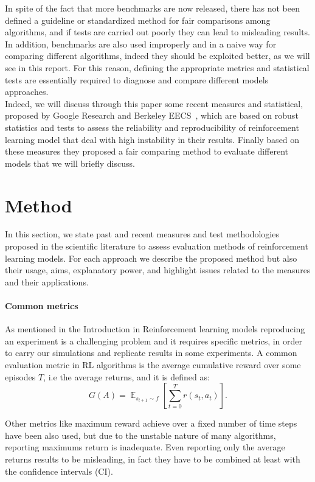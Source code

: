 \documentclass{article}
\DeclareMathOperator{\EX}{\mathbb{E}}%
\begin{document}
In spite of the fact that more benchmarks are now released, there has not been defined a guideline or standardized method for fair comparisons among algorithms, and if tests are carried out poorly they can lead to misleading results. In addition, benchmarks are also used improperly and in a naive way for comparing different algorithms, indeed they should be exploited better, as we will see in this report.
For this reason, defining the appropriate metrics and statistical tests are essentially required to diagnose and compare different models approaches.\\
Indeed, we will discuss through this paper some recent measures and statistical, proposed by Google Research and Berkeley EECS~\cite{GoogleMeasure}, which are based on robust statistics and tests to assess the reliability and reproducibility of reinforcement learning model that deal with high instability in their results. Finally based on these measures they proposed a fair comparing method to evaluate different models that we will briefly discuss.


\section{Method}
In this section, we state past and recent measures and test methodologies proposed in the scientific literature to assess evaluation methods of reinforcement learning models. For each approach we describe the proposed method but also their usage, aims, explanatory power, and highlight issues related to the measures and their applications.
\paragraph{Common metrics}
As mentioned in the Introduction in Reinforcement learning models reproducing an experiment is a challenging problem and it requires specific metrics, in order to carry our simulations and replicate results in some experiments.
A common evaluation metric in RL algorithms is the average cumulative reward over some episodes $T$, i.e the average returns, and it is defined as:	
\begin{equation}
G(A) = \EX_{s_{t+1} \sim f} \left[\sum_{t=0}^{T} r(s_t, a_t)\right].	
\end{equation}

Other metrics like maximum reward achieve over a fixed number of time steps have been also used, but  due to the unstable nature of many algorithms, reporting maximums return is inadequate. Even reporting only the average returns results to be misleading, in fact they have to be combined at least with the confidence intervals (CI).
\end{document}
